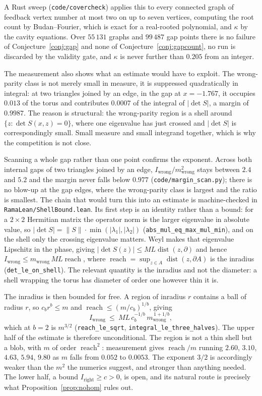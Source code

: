 \documentclass[11pt]{article}
\theoremstyle{remark}
\begin{document}
A Rust sweep (\texttt{code/covercheck}) applies this to every connected graph of feedback
vertex number at most two on up to seven vertices, computing the root count by
Budan--Fourier, which is exact for a real-rooted polynomial, and $\kappa$ by the cavity
equations. Over $55\,131$ graphs and $99\,487$ gap points there is no failure of
Conjecture~\ref{conj:gap} and none of Conjecture~\ref{conj:gapcount}, no run is discarded by
the validity gate, and $\kappa$ is never further than $0.205$ from an integer.

The measurement also shows what an estimate would have to exploit. The wrong-parity class
is not merely small in measure, it is suppressed quadratically in integral: at two triangles
joined by an edge, in the gap at $x=-1.767$, it occupies $0.013$ of the torus and
contributes $0.0007$ of the integral of $|\det S|$, a margin of $0.9987$. The reason is
structural: the wrong-parity region is a shell around $\{z:\det S(x,z)=0\}$, where one
eigenvalue has just crossed and $|\det S|$ is correspondingly small. Small measure and small
integrand together, which is why the competition is not close.

Scanning a whole gap rather than one point confirms the exponent. Across both internal gaps
of two triangles joined by an edge, $I_{\mathrm{wrong}}/m_{\mathrm{wrong}}^2$ stays between
$2.4$ and $5.2$ and the margin never falls below $0.977$
(\texttt{code/margin\_scan.py}); there is no blow-up at the gap edges, where the
wrong-parity class is largest and the ratio is smallest. The chain that would turn this into
an estimate is machine-checked in \texttt{RamaLean/ShellBound.lean}. Its first step is an
identity rather than a bound: for a $2\times2$ Hermitian matrix the operator norm is the
larger eigenvalue in absolute value, so
$|\det S|=\lVert S\rVert\cdot\min(|\lambda_1|,|\lambda_2|)$
(\texttt{abs\_mul\_eq\_max\_mul\_min}), and on the shell only the crossing eigenvalue
matters. Weyl makes that eigenvalue Lipschitz in the phase, giving
$|\det S(z)|\le ML\operatorname{dist}(z,\partial)$ and hence
$I_{\mathrm{wrong}}\le m_{\mathrm{wrong}}\,ML\operatorname{reach}$, where
$\operatorname{reach}=\sup_{z\in A}\operatorname{dist}(z,\partial A)$ is the inradius
(\texttt{det\_le\_on\_shell}). The relevant quantity is the inradius and not the diameter: a
shell wrapping the torus has diameter of order one however thin it is.

The inradius is then bounded for free. A region of inradius $r$ contains a ball of radius
$r$, so $c_br^b\le m$ and $\operatorname{reach}\le(m/c_b)^{1/b}$, giving
\[
   I_{\mathrm{wrong}}\ \le\ ML\,c_b^{-1/b}\,m_{\mathrm{wrong}}^{\,1+1/b},
\]
which at $b=2$ is $m^{3/2}$ (\texttt{reach\_le\_sqrt},
\texttt{integral\_le\_three\_halves}). The upper half of the estimate is therefore
unconditional. The region is not a thin shell but a blob, with $m$ of order
$\operatorname{reach}^2$: measurement gives $\operatorname{reach}/m$ running $2.60$, $3.10$,
$4.63$, $5.94$, $9.80$ as $m$ falls from $0.052$ to $0.0053$. The exponent $3/2$ is accordingly
weaker than the $m^2$ the numerics suggest, and stronger than anything needed. The lower half, a bound $I_{\mathrm{right}}\ge c>0$, is open, and
its natural route is precisely what Proposition~\ref{prop:nohom} rules out.
\end{document}
